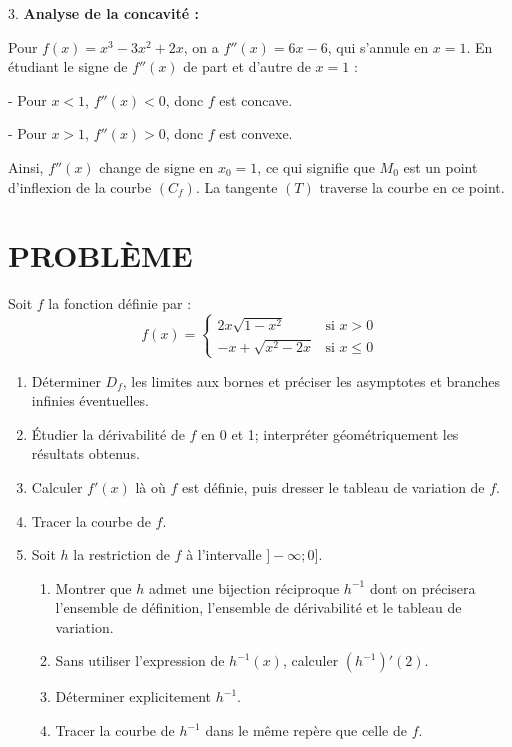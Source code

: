 \documentclass{article}
\begin{document}
3. \textbf{Analyse de la concavité :}

   Pour \( f(x) = x^3 - 3x^2 + 2x \), on a \( f''(x) = 6x - 6 \), qui s'annule en \( x = 1 \). En étudiant le signe de \( f''(x) \) de part et d'autre de \( x = 1 \) :
   
   - Pour \( x < 1 \), \( f''(x) < 0 \), donc \( f \) est concave.
   
   - Pour \( x > 1 \), \( f''(x) > 0 \), donc \( f \) est convexe.

   Ainsi, \( f''(x) \) change de signe en \( x_0 = 1 \), ce qui signifie que \( M_0 \) est un point d'inflexion de la courbe \( (C_f) \). La tangente \( (T) \) traverse la courbe en ce point.
\section*{PROBLÈME}

Soit $f$ la fonction définie par :
\[
f(x) =
\begin{cases} 
2x\sqrt{1 - x^2} & \text{si } x > 0 \\ 
-x + \sqrt{x^2 - 2x} & \text{si } x \leq 0 
\end{cases}
\]

\begin{enumerate}
    \item Déterminer $D_f$, les limites aux bornes et préciser les asymptotes et branches infinies éventuelles.
    \item Étudier la dérivabilité de $f$ en 0 et 1; interpréter géométriquement les résultats obtenus.
    \item Calculer $f'(x)$ là où $f$ est définie, puis dresser le tableau de variation de $f$.
    \item Tracer la courbe de $f$.
    \item Soit $h$ la restriction de $f$ à l’intervalle $]-\infty ; 0]$.
    \begin{enumerate}
        \item Montrer que $h$ admet une bijection réciproque $h^{-1}$ dont on précisera l’ensemble de définition, l’ensemble de dérivabilité et le tableau de variation.
        \item Sans utiliser l’expression de $h^{-1}(x)$, calculer $(h^{-1})'(2)$.
        \item Déterminer explicitement $h^{-1}$.
        \item Tracer la courbe de $h^{-1}$ dans le même repère que celle de $f$.
    \end{enumerate}
\end{enumerate}
\end{document}
